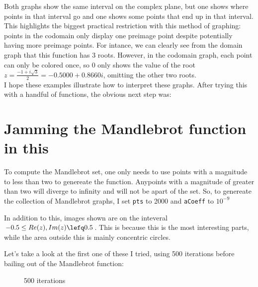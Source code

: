 \documentclass[letterpaper,12pt]{article}
\begin{document}
Both graphs show the same interval on the complex plane, but one shows where points in that interval go and one shows some points that end up in that interval.
This highlights the biggest practical restriction with this method of graphing: points in the codomain only display one preimage point despite potentially having more preimage points.
For intance, we can clearly see from the domain graph that this function has 3 roots.
However, in the codomain graph, each point can only be colored once, so 0 only shows the value of the root $z= \frac{-1 + i\sqrt{3}}{2} = -0.5000 + 0.8660i$, omitting the other two roots. \\

I hope these examples illustrate how to interpret these graphs.
After trying this with a handful of functions, the obvious next step was:

\section{Jamming the Mandlebrot function in this}

To compute the Mandlebrot set, one only needs to use points with a magnitude to less than two to genereate the function.
Anypoints with a magnitude of greater than two will diverge to infinity and will not be apart of the set.
So, to genereate the collection of Mandlebrot graphs, I set \verb|pts| to 2000 and \verb|aCoeff| to $10^{-9}$

In addition to this, images shown are on the inteveral $ -0.5 \leq Re(z), Im(z) \lefq 0.5$.
This is because this is the most interesting parts, while the area outside this is mainly concentric circles.

Let's take a look at the first one of these I tried, using 500 iterations before bailing out of the Mandlebrot function:

\begin{figure}[h]
	\noindent{}
	\centering
	\caption{500 iterations}
	\centering
\end{figure}
\end{document}
